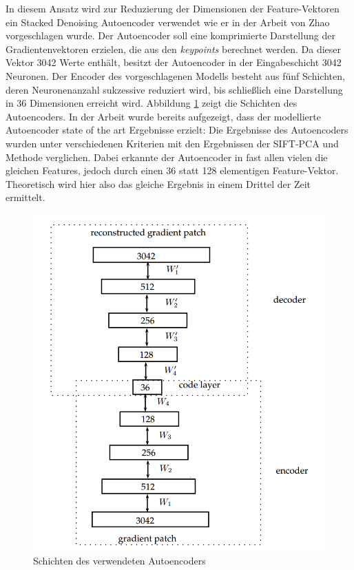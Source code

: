 In diesem Ansatz wird zur Reduzierung der Dimensionen der Feature-Vektoren ein Stacked Denoising Autoencoder verwendet wie er in der Arbeit von Zhao \cite{aed2016} vorgeschlagen wurde. Der Autoencoder soll eine komprimierte Darstellung der Gradientenvektoren erzielen, die aus den \textit{keypoints} berechnet werden. Da dieser Vektor 3042 Werte enthält, besitzt der Autoencoder in der Eingabeschicht 3042 Neuronen. Der Encoder des vorgeschlagenen Modells besteht aus fünf Schichten, deren Neuronenanzahl sukzessive reduziert wird, bis schließlich eine Darstellung in 36 Dimensionen erreicht wird. Abbildung \ref{img:ae_model} zeigt die Schichten des Autoencoders. In der Arbeit wurde bereits aufgezeigt, dass der modellierte Autoencoder state of the art Ergebnisse erzielt: Die Ergebnisse des Autoencoders wurden unter verschiedenen Kriterien mit den Ergebnissen der SIFT-PCA und  Methode verglichen. Dabei erkannte der Autoencoder in fast allen vielen die gleichen Features, jedoch durch einen 36 statt 128 elementigen Feature-Vektor. Theoretisch wird hier also das gleiche Ergebnis in einem Drittel der Zeit ermittelt.

\begin{figure}
	\centering
	\includegraphics[scale=0.6]{images/ae_model.png}
	\caption{Schichten des verwendeten Autoencoders \cite{aed2016}}
	\label{img:ae_model}
\end{figure}


